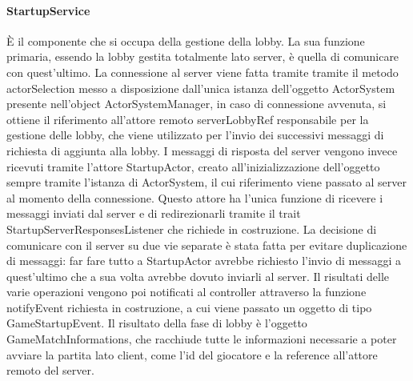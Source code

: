 \paragraph{StartupService}
È il componente che si occupa della gestione della lobby.
La sua funzione primaria, essendo la lobby gestita totalmente lato server, è quella di comunicare con quest’ultimo.
La connessione al server viene fatta tramite tramite il metodo actorSelection messo a disposizione dall’unica istanza dell’oggetto ActorSystem presente nell’object ActorSystemManager, in caso di connessione avvenuta, si ottiene il riferimento all’attore remoto serverLobbyRef responsabile per la gestione delle lobby, che viene utilizzato per l’invio dei successivi messaggi di richiesta di aggiunta alla lobby.
I messaggi di risposta del server vengono invece ricevuti tramite l’attore StartupActor, creato all’inizializzazione dell’oggetto sempre tramite l’istanza di ActorSystem, il cui riferimento viene passato al server al momento della connessione.
Questo attore ha l’unica funzione di ricevere i messaggi inviati dal server e di redirezionarli tramite il trait StartupServerResponsesListener che richiede in costruzione.
La decisione di comunicare con il server su due vie separate è stata fatta per evitare duplicazione di messaggi: far fare tutto a StartupActor avrebbe richiesto l’invio di messaggi a quest’ultimo che a sua volta avrebbe dovuto inviarli al server.
Il risultati delle varie operazioni vengono poi notificati al controller attraverso la funzione notifyEvent richiesta in costruzione, a cui viene passato un oggetto di tipo GameStartupEvent.
Il risultato della fase di lobby è l’oggetto GameMatchInformations, che racchiude tutte le informazioni necessarie a poter avviare la partita lato client, come l'id del giocatore e la reference all'attore remoto del server.

